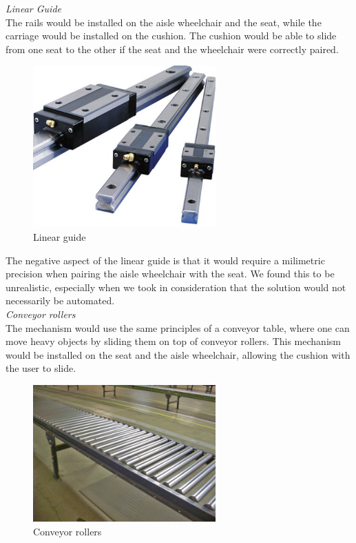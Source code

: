\noindent\emph{Linear Guide}\\
The rails would be installed on the aisle wheelchair and the seat, while the carriage would be installed on the cushion. The cushion would be able to slide from one seat to the other if the seat and the wheelchair were correctly paired.

\begin{figure}[h]
\centering
\includegraphics[width=7cm]{brazil_images/image035.jpg}
\caption{Linear guide} %
\label{fig:linear_guide}
\end{figure}

The negative aspect of the linear guide is that it would require a milimetric precision when pairing the aisle wheelchair with the seat. We found this to be unrealistic, especially when we took in consideration that the solution would not necessarily be automated.\\

\noindent\emph{Conveyor rollers}\\
The mechanism would use the same principles of a conveyor table, where one can move heavy objects by sliding them on top of conveyor rollers. This mechanism would be installed on the seat and the aisle wheelchair, allowing the cushion with the user to slide.

\begin{figure}[h]
\centering
\includegraphics[width=7cm]{brazil_images/image036.jpg}
\caption{Conveyor rollers} %
\label{fig:conveyor_rollers}
\end{figure}

